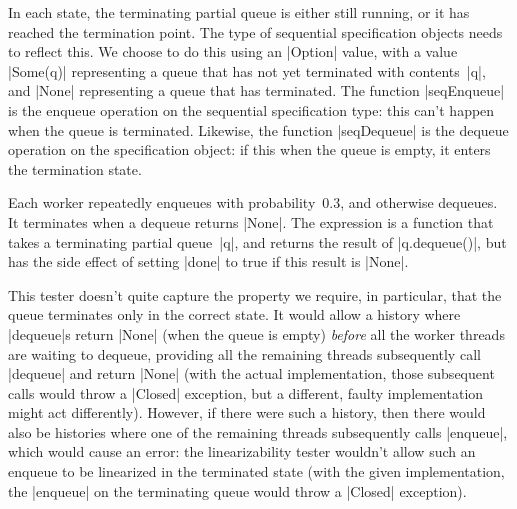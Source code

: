 In each state, the terminating partial queue is either still running, or it
has reached the termination point.  The type of sequential specification
objects needs to reflect this.  We choose to do this using an |Option| value,
with a value |Some(q)| representing a queue that has not yet terminated with
contents~|q|, and |None| representing a queue that has terminated.  The
function |seqEnqueue| is the enqueue operation on the sequential specification
type: this can't happen when the queue is terminated.  Likewise, the function
|seqDequeue| is the dequeue operation on the specification object: if this
when the queue is empty, it enters the termination state.

Each worker repeatedly enqueues with probability~$0.3$, and otherwise
dequeues.  It terminates when a dequeue returns |None|.  The expression
is a function that takes a terminating partial queue~|q|, and returns the
result of |q.dequeue()|, but has the side effect of setting |done| to true
if this result is |None|.  

This tester doesn't quite capture the property we require, in particular, that
the queue terminates only in the correct state.  It would allow a history
where |dequeue|s return |None| (when the queue is empty) \emph{before} all the
worker threads are waiting to dequeue, providing all the remaining threads
subsequently call |dequeue| and return |None| (with the actual implementation,
those subsequent calls would throw a |Closed| exception, but a different,
faulty implementation might act differently).  However, if there were such a
history, then there would also be histories where one of the remaining threads
subsequently calls |enqueue|, which would cause an error: the linearizability
tester wouldn't allow such an enqueue to be linearized in the terminated state
(with the given implementation, the |enqueue| on the terminating queue would
throw a |Closed| exception).
